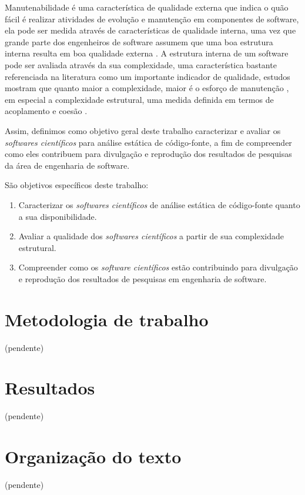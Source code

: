Manutenabilidade é uma característica de qualidade externa que indica o quão
fácil é realizar atividades de evolução e manutenção em componentes de
software, ela pode ser medida através de características de qualidade interna,
uma vez que grande parte dos engenheiros de software assumem que uma boa
estrutura interna resulta em boa qualidade externa \cite{Fenton2014}. A
estrutura interna de um software pode ser avaliada através da sua complexidade,
uma característica bastante referenciada na literatura como um importante
indicador de qualidade, estudos mostram que quanto maior a complexidade, maior
é o esforço de manutenção \cite{hashim1996software, Darcy2005}, em especial a
complexidade estrutural, uma medida definida em termos de acoplamento e coesão
\cite{Terceiro2012}.

Assim, definimos como objetivo geral deste trabalho caracterizar e avaliar os
{\it softwares científicos} para análise estática de código-fonte, a fim de
compreender como eles contribuem para divulgação e reprodução dos resultados de
pesquisas da área de engenharia de software.

São objetivos específicos deste trabalho:

\begin{enumerate}
  \item Caracterizar os {\it softwares científicos} de análise estática de código-fonte quanto a sua disponibilidade.
  \item Avaliar a qualidade dos {\it softwares científicos} a partir de sua complexidade estrutural.
  \item Compreender como os {\it software científicos} estão contribuindo para divulgação e reprodução dos resultados de pesquisas em engenharia de software.
\end{enumerate}

\section{Metodologia de trabalho}

(pendente)

\section{Resultados}

(pendente)

\section{Organização do texto}

(pendente)
